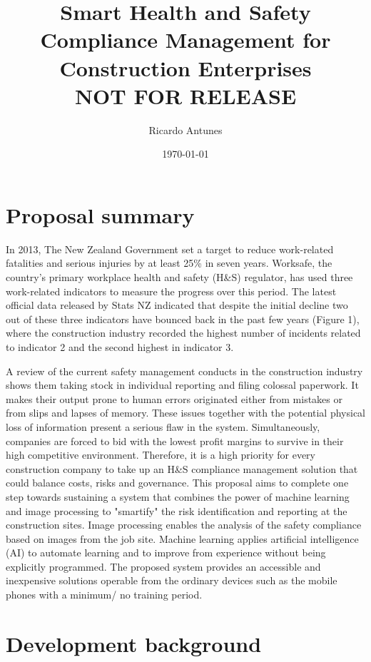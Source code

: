 \documentclass{article}
\author{Ricardo Antunes}
\date{\today}
\title{Smart Health and Safety Compliance Management for Construction Enterprises\\\medskip
\large NOT FOR RELEASE}
\begin{document}
\maketitle
\tableofcontents



\section{Proposal summary}
\label{sec:org46e007e}
In 2013, The New Zealand Government set a target to reduce work-related fatalities and serious injuries by at least 25\% in seven years. Worksafe, the country's primary workplace health and safety (H\&S) regulator, has used three work-related indicators to measure the progress over this period. The latest official data released by Stats NZ indicated that despite the initial decline two out of these three indicators have bounced back in the past few years (Figure 1), where the construction industry recorded the highest number of incidents related to indicator 2 and the second highest in indicator 3.  

A review of the current safety management conducts in the construction industry shows them taking stock in individual reporting and filing colossal paperwork. It makes their output prone to human errors originated either from mistakes or from slips and lapses of memory. These issues together with the potential physical loss of information present a serious flaw in the system. Simultaneously, companies are forced to bid with the lowest profit margins to survive in their high competitive environment. Therefore, it is a high priority for every construction company to take up an H\&S compliance management solution that could balance costs, risks and governance. This proposal aims to complete one step towards sustaining a system that combines the power of machine learning and image processing to "smartify" the risk identification and reporting at the construction sites. Image processing enables the analysis of the safety compliance based on images from the job site. Machine learning applies artificial intelligence (AI) to automate learning and to improve from experience without being explicitly programmed. The proposed system provides an accessible and inexpensive solutions operable from the ordinary devices such as the mobile phones with a minimum/ no training period.

\section{Development background}
\label{sec:org9a36077}
\end{document}
